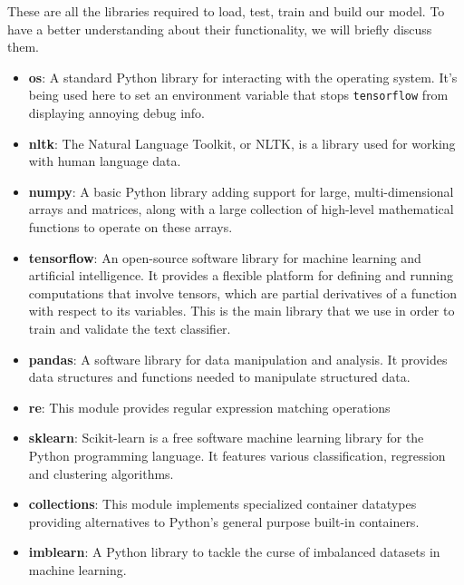 These are all the libraries required to load, test, train and build our model. To have a better understanding about their functionality, we will briefly discuss them.
\begin{itemize}
	\item \textbf{os}: A standard Python library for interacting with the operating system. It's being used here to set an environment variable that stops \verb|tensorflow| from displaying annoying debug info.
	
	\item \textbf{nltk}: The Natural Language Toolkit, or NLTK, is a library used for working with human language data.
	
	\item \textbf{numpy}: A basic Python library adding support for large, multi-dimensional arrays and matrices, along with a large collection of high-level mathematical functions to operate on these arrays.
	
	\item \textbf{tensorflow}: An open-source software library for machine learning and artificial intelligence. It provides a flexible platform for defining and running computations that involve tensors, which are partial derivatives of a function with respect to its variables. This is the main library that we use in order to train and validate the text classifier.
	
	\item \textbf{pandas}: A software library for data manipulation and analysis. It provides data structures and functions needed to manipulate structured data.
	
	\item \textbf{re}: This module provides regular expression matching operations
	
	\item \textbf{sklearn}: Scikit-learn is a free software machine learning library for the Python programming language. It features various classification, regression and clustering algorithms.
	
	\item \textbf{collections}: This module implements specialized container datatypes providing alternatives to Python’s general purpose built-in containers.
	
	\item \textbf{imblearn}: A Python library to tackle the curse of imbalanced datasets in machine learning.
\end{itemize}

